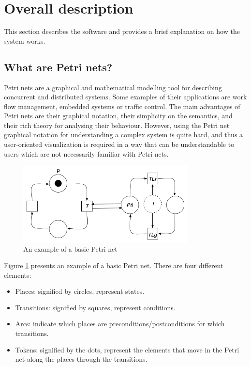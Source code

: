 \section{Overall description}
\label{sec:overall}
This section describes the software and provides a brief explanation on how the system works.

\subsection{What are Petri nets?}

Petri nets are a graphical and mathematical modelling tool for describing concurrent and distributed systems. Some examples of their applications are work flow management, embedded systems or traffic control. The main advantages of Petri nets are their graphical notation, their simplicity on the semantics, and their rich theory for analysing their behaviour. However, using the Petri net graphical notation for understanding a complex system is quite hard, and thus a user-oriented visualization is required in a way that can be understandable to users which are not necessarily familiar with Petri nets.


\begin{figure}[htp]
\begin{center}
  \includegraphics[width=0.8\textwidth]{image/petrinet_diagram.png}
  \caption{An example of a basic Petri net}
  \label{fig:petrinet}
\end{center}
\end{figure}

Figure \ref{fig:petrinet} presents an example of a basic Petri net. There are four different elements:

\begin{itemize}
\item Places: signified by circles, represent states.
\item Transitions: signified by squares, represent conditions.
\item Arcs: indicate which places are preconditions/postconditions for which transitions.
\item Tokens: signified by the dots, represent the elements that move in the Petri net along the places through the transitions.
\end{itemize}


